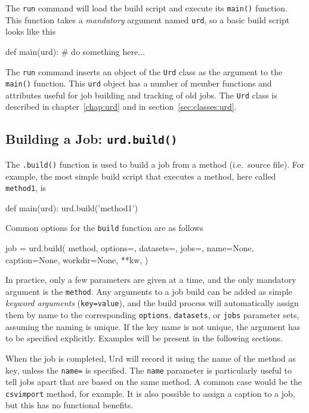 The \texttt{run} command will load the build script and execute
its \texttt{main()} function.  This function takes
a \textsl{mandatory} argument named \texttt{urd}, so a basic build
script looks like this
\begin{python}
def main(urd):
    # do something here...
\end{python}
The \texttt{run} command inserts an object of the \texttt{Urd} class
as the argument to the \texttt{main()} function.  This \texttt{urd}
object has a number of member functions and attributes useful for job
building and tracking of old jobs.  The \texttt{Urd} class is
described in chapter~\ref{chap:urd} and in
section~\ref{sec:classes:urd}.



\subsection{Building a Job: \texttt{urd.build()}}
The \texttt{.build()} function is used to build a job from a method
(i.e.\ source file).  For example, the most simple build script that
executes a method, here called \texttt{method1}, is
\begin{python}
def main(urd):
    urd.build('method1')
\end{python}
Common options for the \texttt{build} function are as follows
\begin{python}
    job = urd.build(
        method,
        options={}, datasets={}, jobs={},
        name=None, caption=None, workdir=None,
        **kw,
    )
\end{python}
In practice, only a few parameters are given at a time, and the only
mandatory argument is the \texttt{method}.  Any arguments to a job
build can be added as simple \textsl{keyword arguments}
(\texttt{key=value}), and the build process will
automatically assign them by name to the corresponding
\texttt{options}, \texttt{datasets}, or \texttt{jobs} parameter
sets, assuming the naming is unique.  If the key name is not unique,
the argument has to be specified explicitly.  Examples will be present
in the following sections.

When the job is completed, Urd will record it using the name of the
method as key, unless the \texttt{name=} is specified.
The \texttt{name} parameter is particularly useful to tell jobs apart
that are based on the same method.  A common case would be
the \texttt{csvimport} method, for example.  It is also possible to
assign a caption to a job, but this has no functional benefits.


